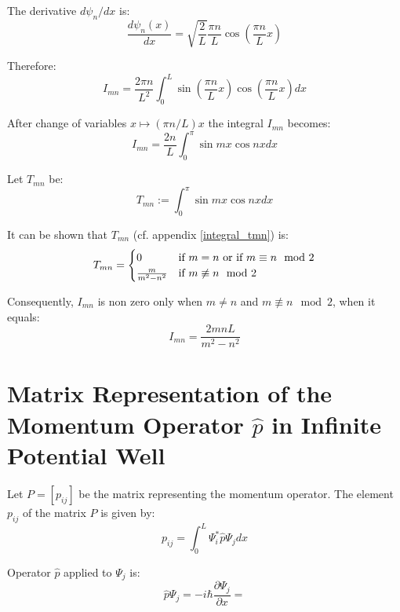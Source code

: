 \documentclass[12pt]{article}
\begin{document}
\noindent The derivative $d \psi_n / dx$ is:
\begin{equation}
\frac{d \psi_n(x)}{dx} = \sqrt{\frac{2}{L}} \frac{\pi n}{L} \cos \left( \frac{\pi n}{L} x \right)
\end{equation}

\noindent Therefore:
\begin{equation}
I_{mn} = \frac{2 \pi n}{L^2} \int_{0}^{L} \sin  \left( \frac{\pi n}{L} x \right) \cos \left( \frac{\pi n}{L} x \right) dx
\end{equation}

\noindent After change of variables $x \mapsto (\pi n/L)x$ the integral $I_{mn}$ becomes:
\begin{equation}
I_{mn} = \frac{2n}{L} \int_0^{\pi} \sin mx \cos nx dx 
\end{equation}

\noindent Let $T_{mn}$ be: 
\begin{equation}
T_{mn} := \int_{0}^{\pi} \sin mx \cos nx dx
\end{equation}

\noindent It can be shown that $T_{mn}$ (cf. appendix \ref{integral_tmn}) is:
\begin{equation}
T_{mn} = \begin{cases} 
0 & \text{if $ m = n $ or if $ m \equiv n \mod 2 $} \\ 
\frac{m}{m^2 - n^2} & \text{if $ m \not\equiv n \mod 2 $}
\end{cases}
\end{equation}

Consequently, $I_{mn}$ is non zero only when $m \neq n$ and $m \not \equiv n \mod 2$, when it equals:
\begin{equation}
I_{mn} = \frac{2 mn L }{m^2 - n^2}
\end{equation}


\section{Matrix Representation of the Momentum Operator $\hat{p}$ in Infinite Potential Well}
Let $P = [p_{ij}]$ be the matrix representing the momentum operator. The element $p_{ij}$ of the matrix $P$ is given by:
\begin{equation}
\label{p_element}
p_{ij} = \int_{0}^{L} \Psi^{*}_{i} \hat{p} \Psi_j dx
\end{equation}

Operator $\hat{p}$ applied to $\Psi_j$ is:
\begin{equation}
\hat{p} \Psi_j = -i \hbar \frac{\partial \Psi_j}{\partial x} = 
\end{equation}
\end{document}
